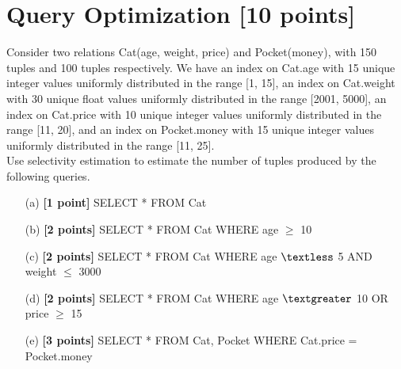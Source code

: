 \documentclass[10pt]{article}
\begin{document}
\newpage
\section{Query Optimization \textbf{[10 points]}}
Consider two relations Cat(age, weight, price) and Pocket(money), with 150 tuples and 100 tuples respectively.
We have an index on Cat.age with 15 unique integer values uniformly distributed in the range [1, 15],
an index on Cat.weight with 30 unique float values uniformly distributed in the range [2001, 5000],
an index on Cat.price with 10 unique integer values uniformly distributed in the range [11, 20],
and an index on Pocket.money with 15 unique integer values uniformly distributed in the range [11, 25]. \\
Use selectivity estimation to estimate the number of tuples produced by the following queries.
\begin{itemize}
	\item[(a)] \textbf{[1 point]} SELECT * FROM Cat\\
	\item[(b)] \textbf{[2 points]} SELECT * FROM Cat WHERE age $\geq$ 10\\
	\item[(c)] \textbf{[2 points]} SELECT * FROM Cat WHERE age $\textless$ 5 AND weight $\leq$ 3000\\
	\item[(d)] \textbf{[2 points]} SELECT * FROM Cat WHERE age $\textgreater$ 10 OR price $\geq$ 15\\
	\item[(e)] \textbf{[3 points]} SELECT * FROM Cat, Pocket WHERE Cat.price = Pocket.money\\
\end{itemize}



\newpage
\end{document}
